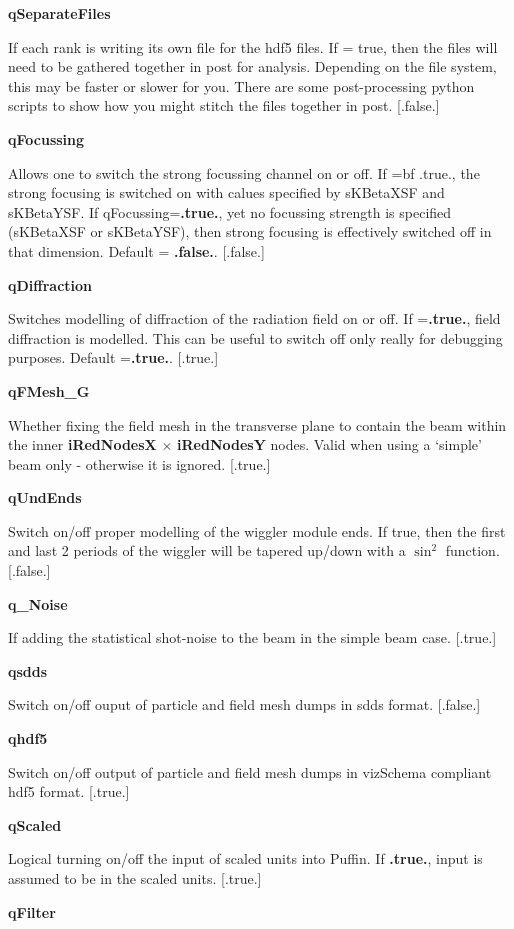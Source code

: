 \documentclass[12pt]{article}%
\begin{document}
{\bf qSeparateFiles}

If each rank is writing its own file for the hdf5 files. If = true, then the files will need to be gathered together in post for analysis. Depending on the file system, this may be faster or slower for you. There are some post-processing python scripts to show how you might stitch the files together in post. [.false.]

{\bf qFocussing}

Allows one to switch the strong focussing channel on or off. If ={bf .true.}, the strong focusing is switched on with calues specified by sKBetaXSF and sKBetaYSF. If qFocussing={\bf .true.}, yet no focussing strength is specified (sKBetaXSF or sKBetaYSF), then strong focusing is effectively switched off in that dimension. Default = {\bf .false.}. [.false.]

{\bf qDiffraction}

Switches modelling of diffraction of the radiation field on or off. If ={\bf .true.}, field diffraction is modelled. This can be useful to switch off only really for debugging purposes. Default ={\bf .true.}. [.true.]

{\bf qFMesh\_G}

Whether fixing the field mesh in the transverse plane to contain the beam within the inner {\bf iRedNodesX} $\times$ {\bf iRedNodesY} nodes. Valid when using a `simple' beam only - otherwise it is ignored. [.true.]

{\bf qUndEnds}

Switch on/off proper modelling of the wiggler module ends. If true, then the first and last 2 periods of the wiggler will be tapered up/down with a $\sin^2$ function. [.false.]

{\bf q\_Noise}

If adding the statistical shot-noise to the beam in the simple beam case. [.true.]

{\bf qsdds}

Switch on/off ouput of particle and field mesh dumps in sdds format. [.false.]

{\bf qhdf5}

Switch on/off output of particle and field mesh dumps in vizSchema compliant hdf5 format. [.true.]

{\bf qScaled}

Logical turning on/off the input of scaled units into Puffin. If {\bf .true.}, input is assumed to be in the scaled units. [.true.]

{\bf qFilter}
\end{document}
